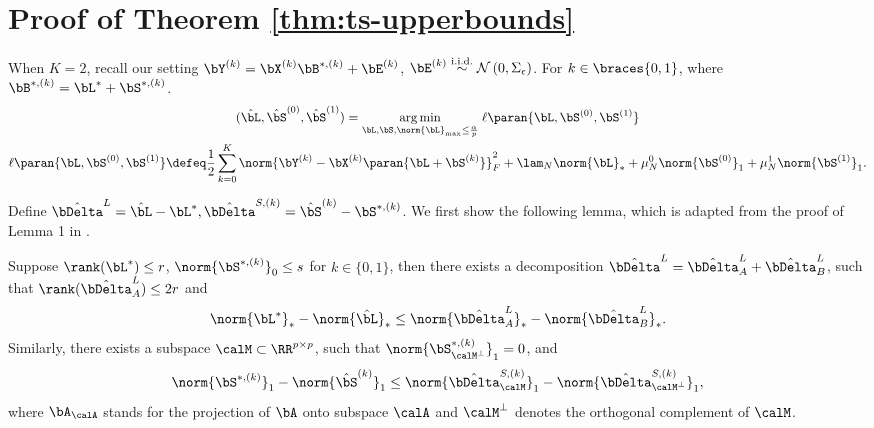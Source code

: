 \section*{Proof of Theorem \ref{thm:ts-upperbounds}}
	When $K=2$, recall our setting
	$\bY^{(k)} = \bX^{(k)}\bB^{*, (k)} + \bE^{(k)}$, $\bE^{(k)} \overset{\text{i.i.d.}}{\sim} \mathcal{N}\left(0, \Sigma_{\epsilon}\right)$. 
 For $k \in \braces{0, 1}$, where $\bB^{*, (k)} = \bL^* + \bS^{*,(k)}$.
	\begin{gather}
		(\hat\bL, \hat\bS^{(0)}, \hat\bS^{(1)}) 
		= \underset{\bL, \bS, \norm{\bL}_{\max} \leq \frac{\alpha}{p} }{\arg\min}\; \ell\paran{\bL, \bS^{(0)}, \bS^{(1)}}  \nonumber \\
		\ell\paran{\bL, \bS^{(0)}, \bS^{(1)}} 
		\defeq
		\frac{1}{2} \sum_{k=0}^K\norm{\bY^{(k)} - \bX^{(k)}\paran{\bL + \bS^{(k)}}}_F^2
		+ \lam_N \norm{\bL}_* 
		+ \mu^0_{N} \norm{\bS^{(0)}}_1
		+ \mu^1_{N} \norm{\bS^{(1)}}_1. \label{eqn:tl-rank-sparse-K=2}
	\end{gather}
	
	Define $\hat\bDelta^{L}=\hat\bL-\bL^*, \hat\bDelta^{S, (k)}=\hat\bS^{(k)}-\bS^{*, (k)}$. We first show the following lemma, which is adapted from the proof of Lemma 1 in \cite{negahban2012unified}.
	\begin{lemma}
		Suppose $\rank(\bL^*) \leq r$, $\norm{\bS^{*, (k)}}_0 \leq s$ for $k \in \{0, 1\}$, then there exists a decomposition $\hat\bDelta^{L}=\hat\bDelta^{L}_A+ \hat\bDelta^{L}_B$, such that $\rank(\hat\bDelta^{L}_A) \leq 2r$ and
		\begin{equation}
			\norm{\bL^*}_* - \norm{\hat\bL}_* \leq  \norm{\hat\bDelta^{L}_A}_* - \norm{\hat\bDelta^{L}_B}_*.
			\label{ineq:Ldecomp}
		\end{equation}
	   Similarly, there exists a subspace $\calM \subset \RR^{p \times p}$, such that $\norm{\bS^{*, (k)}_{\calM^{\perp}}}_1=0$, and
	    \begin{equation}
	    	\norm{\bS^{*, (k)}}_1 - \norm{\hat\bS^{(k)}}_1 \leq  \norm{\hat\bDelta^{S, (k)}_{\calM}}_1 - \norm{\hat\bDelta^{S, (k)}_{\calM^{\perp}}}_1,
	    	\label{ineq:Sdecomp}
	    \end{equation}
    where $\bA_{\calA}$ stands for the projection of $\bA$ onto subspace $\calA$  and  $\calM^{\perp}$ denotes the orthogonal complement of $\calM$.
	   \label{lem:decomp}
	\end{lemma}
    
